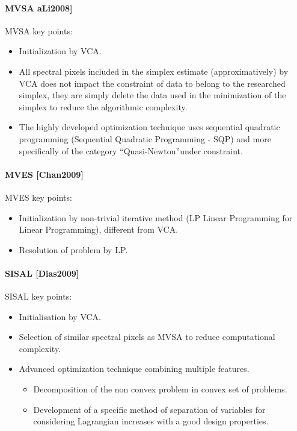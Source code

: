 \paragraph{MVSA aLi2008]} 
MVSA key points: 
\begin{itemize}
\item {Initialization by VCA.}
\item {All spectral pixels included in the simplex estimate
  (approximatively) by VCA does not impact the constraint of  data to belong to the researched simplex, they are
  simply delete the data used in the minimization of the
  simplex to reduce the algorithmic complexity.}
\item {The highly developed optimization technique uses
  sequential quadratic programming (Sequential Quadratic
  Programming - SQP) and more specifically of the category
  ``Quasi-Newton''under constraint.}
\end{itemize} 

\paragraph{MVES [Chan2009]}
 MVES key points: 
\begin{itemize}
\item {Initialization by non-trivial
  iterative method (LP Linear Programming for Linear
  Programming), different from VCA.}
\item {Resolution of problem by LP.}
\end{itemize} 
 

\paragraph{SISAL [Dias2009]}
SISAL key points:
\begin{itemize}
\item {Initialisation by VCA.}
\item {Selection of similar spectral pixels as MVSA to reduce computational complexity.}
\item {Advanced optimization technique
combining multiple features.}
\begin{itemize}
\item {Decomposition of the non convex problem
in convex set of problems.}
\item {Development of a
specific method of separation of variables for considering
Lagrangian increases with a good design properties.}
\end{itemize}
\end{itemize} 

